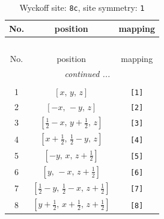 \documentclass[fleqn,8pt]{jsarticle}
\begin{document}
\renewcommand{\arraystretch}{1.2}
\begin{longtable}{ccc}
\caption{Wyckoff site: {\tt 8c}, site symmetry: {\tt 1}}
 \\
 \hline \hline
No. & position & mapping \\ \hline \endfirsthead

\multicolumn{2}{l}{\tablename\ \thetable{}} \\
 \hline \hline
No. & position & mapping \\ \hline \endhead

 \hline \hline
\multicolumn{2}{r}{\footnotesize\it continued ...} \\ \endfoot

 \hline \hline
\multicolumn{2}{r}{} \\ \endlastfoot

1 & $\left[ x,\, y,\, z \right]$ & {\tt [1]} \\ \hline
2 & $\left[ - x,\, - y,\, z \right]$ & {\tt [2]} \\ \hline
3 & $\left[ \frac{1}{2} - x,\, y + \frac{1}{2},\, z \right]$ & {\tt [3]} \\ \hline
4 & $\left[ x + \frac{1}{2},\, \frac{1}{2} - y,\, z \right]$ & {\tt [4]} \\ \hline
5 & $\left[ - y,\, x,\, z + \frac{1}{2} \right]$ & {\tt [5]} \\ \hline
6 & $\left[ y,\, - x,\, z + \frac{1}{2} \right]$ & {\tt [6]} \\ \hline
7 & $\left[ \frac{1}{2} - y,\, \frac{1}{2} - x,\, z + \frac{1}{2} \right]$ & {\tt [7]} \\ \hline
8 & $\left[ y + \frac{1}{2},\, x + \frac{1}{2},\, z + \frac{1}{2} \right]$ & {\tt [8]} \\
\end{longtable}
\end{document}
